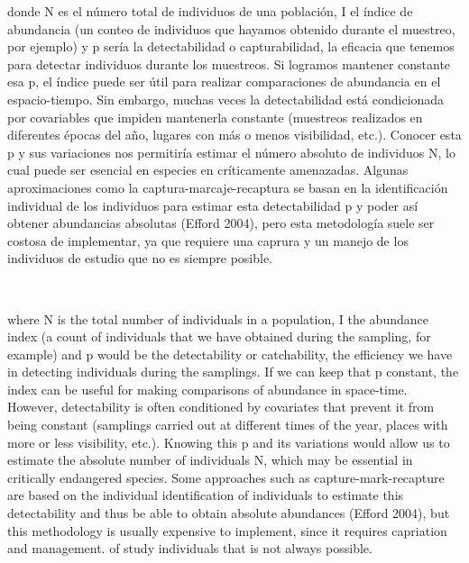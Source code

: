 \documentclass[
]{book}
\begin{document}
\begin{col}{0.45\textwidth}
donde N es el número total de individuos de una población, I el índice de abundancia (un conteo de individuos que hayamos obtenido durante el muestreo, por ejemplo) y p sería la detectabilidad o capturabilidad, la eficacia que tenemos para detectar individuos durante los muestreos. Si logramos mantener constante esa p, el índice puede ser útil para realizar comparaciones de abundancia en el espacio-tiempo. Sin embargo, muchas veces la detectabilidad está condicionada por covariables que impiden mantenerla constante (muestreos realizados en diferentes épocas del año, lugares con más o menos visibilidad, etc.). Conocer esta p y sus variaciones nos permitiría estimar el número absoluto de individuos N, lo cual puede ser esencial en especies en críticamente amenazadas. Algunas aproximaciones como la captura-marcaje-recaptura se basan en la identificación individual de los individuos para estimar esta detectabilidad p y poder así obtener abundancias absolutas (Efford 2004), pero esta metodología suele ser costosa de implementar, ya que requiere una caprura y un manejo de los individuos de estudio que no es siempre posible.

\end{col}

\begin{col}{0.05\textwidth}
~

\end{col}

\begin{col}{0.45\textwidth}
where N is the total number of individuals in a population, I the abundance index (a count of individuals that we have obtained during the sampling, for example) and p would be the detectability or catchability, the efficiency we have in detecting individuals during the samplings. If we can keep that p constant, the index can be useful for making comparisons of abundance in space-time. However, detectability is often conditioned by covariates that prevent it from being constant (samplings carried out at different times of the year, places with more or less visibility, etc.). Knowing this p and its variations would allow us to estimate the absolute number of individuals N, which may be essential in critically endangered species. Some approaches such as capture-mark-recapture are based on the individual identification of individuals to estimate this detectability and thus be able to obtain absolute abundances (Efford 2004), but this methodology is usually expensive to implement, since it requires capriation and management. of study individuals that is not always possible.

\end{col}
\end{document}
